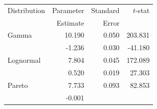 \documentclass[]{book}
\theoremstyle{definition}
\theoremstyle{definition}
\theoremstyle{definition}
\theoremstyle{remark}
\begin{document}
\begin{longtable}[]{@{}lrrr@{}}
\toprule
Distribution & Parameter & Standard & \(t\)-stat\tabularnewline
\begin{minipage}[t]{0.24\columnwidth}\raggedright\strut
\strut
\end{minipage} & \begin{minipage}[t]{0.24\columnwidth}\raggedleft\strut
Estimate\strut
\end{minipage} & \begin{minipage}[t]{0.24\columnwidth}\raggedleft\strut
Error\strut
\end{minipage} & \begin{minipage}[t]{0.24\columnwidth}\raggedleft\strut
\strut
\end{minipage}\tabularnewline
Gamma & 10.190 & 0.050 & 203.831\tabularnewline
\begin{minipage}[t]{0.24\columnwidth}\raggedright\strut
\strut
\end{minipage} & \begin{minipage}[t]{0.24\columnwidth}\raggedleft\strut
-1.236\strut
\end{minipage} & \begin{minipage}[t]{0.24\columnwidth}\raggedleft\strut
0.030\strut
\end{minipage} & \begin{minipage}[t]{0.24\columnwidth}\raggedleft\strut
-41.180\strut
\end{minipage}\tabularnewline
Lognormal & 7.804 & 0.045 & 172.089\tabularnewline
\begin{minipage}[t]{0.24\columnwidth}\raggedright\strut
\strut
\end{minipage} & \begin{minipage}[t]{0.24\columnwidth}\raggedleft\strut
0.520\strut
\end{minipage} & \begin{minipage}[t]{0.24\columnwidth}\raggedleft\strut
0.019\strut
\end{minipage} & \begin{minipage}[t]{0.24\columnwidth}\raggedleft\strut
27.303\strut
\end{minipage}\tabularnewline
Pareto & 7.733 & 0.093 & 82.853\tabularnewline
\begin{minipage}[t]{0.24\columnwidth}\raggedright\strut
\strut
\end{minipage} & \begin{minipage}[t]{0.24\columnwidth}\raggedleft\strut
-0.001\strut
\end{minipage} & \begin{minipage}[t]{0.24\columnwidth}\raggedleft\strut

\end{minipage}
\end{longtable}
\end{document}
